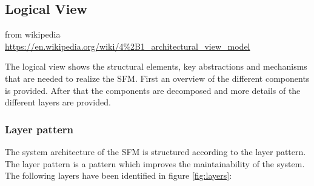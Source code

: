 \subsection{Logical View}

{from wikipedia\\\url{https://en.wikipedia.org/wiki/4\%2B1_architectural_view_model}}

The logical view shows the structural elements, key abstractions and mechanisms that are needed to realize the SFM. First an overview of the different components is provided. After that the components are decomposed and more details of the different layers are provided.





%	

\subsubsection*{Layer pattern}
The system architecture of the SFM is structured according to the layer pattern. The layer pattern is a pattern which improves the maintainability of the system. The following layers have been identified in figure \ref{fig:layers}:

